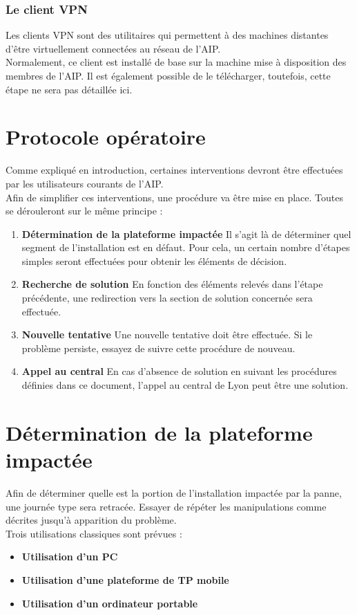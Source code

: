 \documentclass[a4paper]{article}
\begin{document}
\subsubsection{Le client VPN}
Les clients VPN sont des utilitaires qui permettent à des machines distantes d'être virtuellement connectées au réseau de l'AIP.\\
Normalement, ce client est installé de base sur la machine mise à disposition des membres de l'AIP. Il est également possible de le télécharger, toutefois, cette étape ne sera pas détaillée ici.


\section{Protocole opératoire}
Comme expliqué en introduction, certaines interventions devront être effectuées par les utilisateurs courants de l'AIP.\\
Afin de simplifier ces interventions, une procédure va être mise en place. Toutes se dérouleront sur le même principe : 
\begin{enumerate}
	\item \textbf{Détermination de la plateforme impactée} Il s'agit là de déterminer quel segment de l'installation est en défaut. Pour cela, un certain nombre d'étapes simples seront effectuées pour obtenir les éléments de décision.
	\item \textbf{Recherche de solution} En fonction des éléments relevés dans l'étape précédente, une redirection vers la section de solution concernée sera effectuée.
	\item \textbf{Nouvelle tentative} Une nouvelle tentative doit être effectuée. Si le problème persiste, essayez de suivre cette procédure de nouveau.
	\item \textbf{Appel au central} En cas d'absence de solution en suivant les procédures définies dans ce document, l'appel au central de Lyon peut être une solution.
\end{enumerate}

\section{Détermination de la plateforme impactée}
Afin de déterminer quelle est la portion de l'installation impactée par la panne, une journée type sera retracée. Essayer de répéter les manipulations comme décrites jusqu'à apparition du problème.\\
Trois utilisations classiques sont prévues : 
\begin{itemize}
	\item \textbf{Utilisation d'un PC}
	\item \textbf{Utilisation d'une plateforme de TP mobile}
	\item \textbf{Utilisation d'un ordinateur portable}
\end{itemize}
\end{document}
